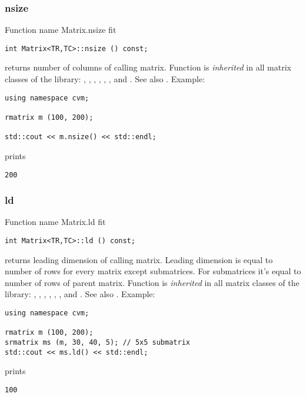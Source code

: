 \subsubsection{nsize}
Function%
\pdfdest name {Matrix.nsize} fit
\begin{verbatim}
int Matrix<TR,TC>::nsize () const;
\end{verbatim}
returns  number of columns of  calling matrix.
Function is \emph{inherited} in all matrix classes
of the library:
,   ,
, ,
, ,
 and .
See also .
Example:
\begin{Verbatim}
using namespace cvm;

rmatrix m (100, 200);

std::cout << m.nsize() << std::endl;
\end{Verbatim}
prints
\begin{Verbatim}
200
\end{Verbatim}
\newpage



\subsubsection{ld}
Function%
\pdfdest name {Matrix.ld} fit
\begin{verbatim}
int Matrix<TR,TC>::ld () const;
\end{verbatim}
returns  leading dimension of  calling matrix.
Leading dimension is equal to  number of rows
for every matrix except submatrices. For submatrices
it's equal to  number of rows of parent matrix.
Function is \emph{inherited} in all matrix classes
of the library:
,   ,
, ,
, ,
 and .
See also .
Example:
\begin{Verbatim}
using namespace cvm;

rmatrix m (100, 200);
srmatrix ms (m, 30, 40, 5); // 5x5 submatrix
std::cout << ms.ld() << std::endl;
\end{Verbatim}
prints
\begin{Verbatim}
100
\end{Verbatim}
\newpage



